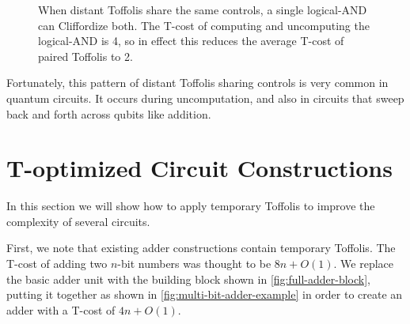 \documentclass[twocolumn,longbibliography]{quantumarticle-customized}
\begin{document}
\begin{figure}
  \caption{
	When distant Toffolis share the same controls, a single logical-AND can Cliffordize both.
    The T-cost of computing and uncomputing the logical-AND is 4, so in effect this reduces the average T-cost of paired Toffolis to 2.
  }
  \label{fig:paired-toffoli-to-logical-and}
\end{figure}

Fortunately, this pattern of distant Toffolis sharing controls is very common in quantum circuits.
It occurs during uncomputation, and also in circuits that sweep back and forth across qubits like addition.


\section{T-optimized Circuit Constructions}
\label{sec:circuit-constructions}

In this section we will show how to apply temporary Toffolis to improve the complexity of several circuits.

First, we note that existing adder constructions contain temporary Toffolis.
The T-cost of adding two $n$-bit numbers was thought to be $8n + O(1)$.
We replace the basic adder unit with the building block shown in \ref{fig:full-adder-block}, putting it together as shown in \ref{fig:multi-bit-adder-example} in order to create an adder with a T-cost of $4n + O(1)$.
\end{document}
